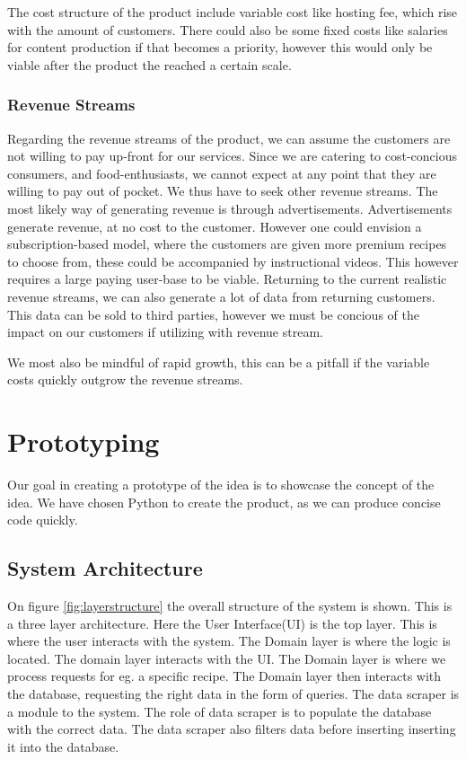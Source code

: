\documentclass{article}
\begin{document}
The cost structure of the product include variable cost like hosting fee, which rise with
the amount of customers. There could also be some fixed costs like salaries for content
production if that becomes a priority, however this would only be viable after the product
the reached a certain scale.

\subsubsection{Revenue Streams}
Regarding the revenue streams of the product, we can assume the customers are not willing
to pay up-front for our services. Since we are catering to cost-concious consumers, and
food-enthusiasts, we cannot expect at any point that they are willing to pay out of
pocket. We thus have to seek other revenue streams. The most likely way of generating
revenue is through advertisements. Advertisements generate revenue, at no cost to the
customer. 
However one could envision a subscription-based model, where the customers are given more
premium recipes to choose from, these could be accompanied by instructional videos. This
however requires a large paying user-base to be viable.
Returning to the current realistic revenue streams, we can also generate a lot of data
from returning customers. This data can be sold to third parties, however we must be
concious of the impact on our customers if utilizing with revenue stream.

We most also be mindful of rapid growth, this can be a pitfall if the variable costs
quickly outgrow the revenue streams.


\section{Prototyping}
Our goal in creating a prototype of the idea is to showcase the concept of the idea. We
have chosen Python to create the product, as we can produce concise code quickly. 

\subsection{System Architecture}

On figure \ref{fig:layerstructure} the overall structure of the system is shown. This is a
three layer architecture. Here the User Interface(UI) is the top layer. This is where the
user interacts with the system. The Domain layer is where the logic is located. The domain
layer interacts with the UI. The Domain layer is where we process requests for eg. a
specific recipe. The Domain layer then interacts with the database, requesting the right
data in the form of queries. The data scraper is a module to the system. The role of data
scraper is to populate the database with the correct data. The data scraper also filters
data before inserting inserting it into the database.
\end{document}
